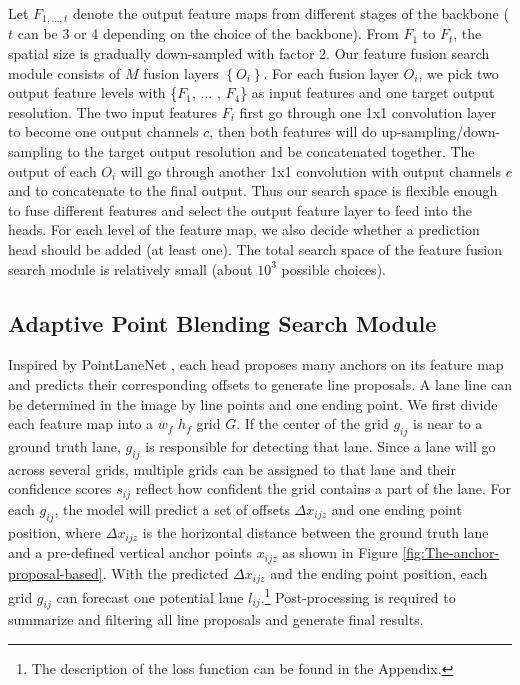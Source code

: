 \documentclass[runningheads]{llncs}
\begin{document}
Let $F_{1,...,t}$ denote the output feature maps from different stages
of the backbone ($t$ can be 3 or 4 depending on the choice of the
backbone). From $F_{1}$ to $F_{t}$, the spatial size is gradually
down-sampled with factor 2. Our feature fusion search module consists
of $M$ fusion layers $\left\{ O_{i}\right\} $. For each fusion layer
$O_{i}$, we pick two output feature levels with \{$F_{1}$, ... ,
$F_{4}$\} as input features and one target output resolution. The
two input features $F_{i}$ first go through one 1x1 convolution layer
to become one output channels $c$, then both features will do up-sampling/down-sampling
to the target output resolution and be concatenated together. The
output of each $O_{i}$ will go through another 1x1 convolution with
output channels $c$ and to concatenate to the final output. Thus
our search space is flexible enough to fuse different features and
select the output feature layer to feed into the heads. For each level
of the feature map, we also decide whether a prediction head should
be added (at least one). The total search space of the feature fusion
search module is relatively small (about $10^{3}$ possible choices).

\subsection{Adaptive Point Blending Search Module\label{subsec:Anchor-proposal-based-Lane}}

Inspired by PointLaneNet \cite{chen2019pointlanenet}, each head proposes
many anchors on its feature map and predicts their corresponding offsets
to generate line proposals. A lane line can be determined in the image
by line points and one ending point. We first divide each feature
map into a $w_{f}$ \texttimes{} $h_{f}$ grid $G$. If the center
of the grid $g_{ij}$ is near to a ground truth lane, $g_{ij}$ is
responsible for detecting that lane. Since a lane will go across several
grids, multiple grids can be assigned to that lane and their confidence
scores $s_{ij}$ reflect how confident the grid contains a part of
the lane. For each $g_{ij}$, the model will predict a set of offsets
$\varDelta x_{ijz}$ and one ending point position, where $\varDelta x_{ijz}$
is the horizontal distance between the ground truth lane and a pre-defined
vertical anchor points $x_{ijz}$ as shown in Figure \ref{fig:The-anchor-proposal-based}.
With the predicted $\varDelta x_{ijz}$ and the ending point position,
each grid $g_{ij}$ can forecast one potential lane $l_{ij}$.\footnote{The description of the loss function can be found in the Appendix.}
 Post-processing is required to summarize and filtering all line
proposals and generate final results.
\end{document}
